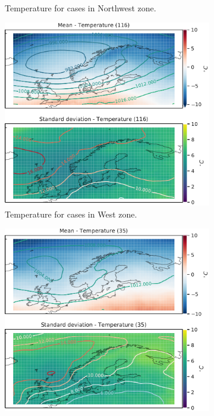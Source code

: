 \begin{figure}
\begin{subfigure}[b]{0.49\textwidth}
    \caption{Temperature for cases in Northwest zone.}
    \label{fig:NordWestTemperature}
\end{subfigure}
\begin{subfigure}[b]{0.49\textwidth}
    \centering
    \includegraphics[width=\textwidth]{Figures/TempVest.pdf}
    \caption{Temperature for cases in West zone.}
    \label{fig:WestTemperature}
\end{subfigure}
\begin{subfigure}[b]{0.49\textwidth}
    \centering
    \includegraphics[width=\textwidth]{Figures/TempSor.pdf}

\end{subfigure}
\end{figure}
